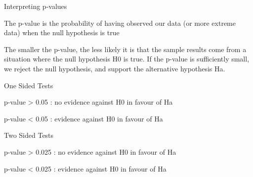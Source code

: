 



\newpage
Interpreting p-values

The p-value is the probability of having observed our data (or more extreme data) when the null hypothesis is true 

The smaller the p-value, the less likely it is that the sample results come from a situation where the null hypothesis H0 is true. If the p-value is sufficiently small, we reject the null hypothesis, and support the alternative hypothesis Ha.


One Sided Tests

p-value  >  0.05   :   no evidence against H0 in favour of Ha

p-value    <  0.05   :   evidence against H0 in favour of Ha

Two Sided Tests

p-value    >  0.025   :   no evidence against H0 in favour of Ha

p-value    <  0.025   :   evidence against H0 in favour of Ha


